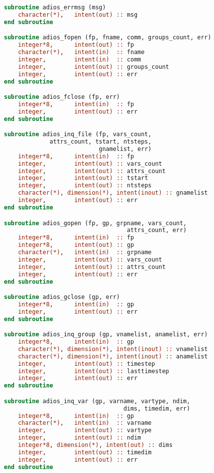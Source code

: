 \begin{lstlisting}[language=Fortran]
subroutine adios_errmsg (msg)
    character(*),   intent(out) :: msg
end subroutine

subroutine adios_fopen (fp, fname, comm, groups_count, err)
    integer*8,      intent(out) :: fp
    character(*),   intent(in)  :: fname
    integer,        intent(in)  :: comm
    integer,        intent(out) :: groups_count
    integer,        intent(out) :: err
end subroutine

subroutine adios_fclose (fp, err)
    integer*8,      intent(in)  :: fp
    integer,        intent(out) :: err
end subroutine

subroutine adios_inq_file (fp, vars_count, 
             attrs_count, tstart, ntsteps, 
                           gnamelist, err)
    integer*8,      intent(in)  :: fp
    integer,        intent(out) :: vars_count
    integer,        intent(out) :: attrs_count
    integer,        intent(out) :: tstart
    integer,        intent(out) :: ntsteps
    character(*), dimension(*), intent(inout) :: gnamelist
    integer,        intent(out) :: err
end subroutine

subroutine adios_gopen (fp, gp, grpname, vars_count, 
                                   attrs_count, err)
    integer*8,      intent(in)  :: fp
    integer*8,      intent(out) :: gp
    character(*),   intent(in)  :: grpname
    integer,        intent(out) :: vars_count
    integer,        intent(out) :: attrs_count
    integer,        intent(out) :: err
end subroutine

subroutine adios_gclose (gp, err)
    integer*8,      intent(in)  :: gp
    integer,        intent(out) :: err
end subroutine

subroutine adios_inq_group (gp, vnamelist, anamelist, err)
    integer*8,      intent(in)  :: gp
    character(*), dimension(*), intent(inout) :: vnamelist
    character(*), dimension(*), intent(inout) :: anamelist
    integer,        intent(out) :: timestep
    integer,        intent(out) :: lasttimestep
    integer,        intent(out) :: err
end subroutine

subroutine adios_inq_var (gp, varname, vartype, ndim, 
                                  dims, timedim, err)
    integer*8,      intent(in)  :: gp
    character(*),   intent(in)  :: varname
    integer,        intent(out) :: vartype
    integer,        intent(out) :: ndim
    integer*8, dimension(*), intent(out) :: dims
    integer,        intent(out) :: timedim
    integer,        intent(out) :: err
end subroutine


\end{lstlisting}
